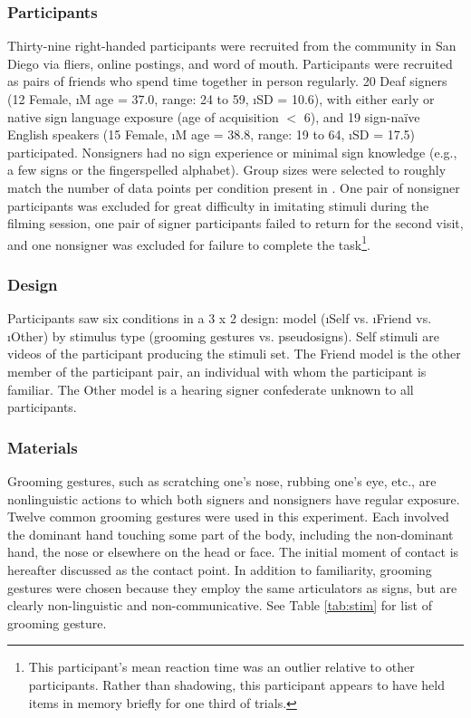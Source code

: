         \subsubsection{Participants}
            Thirty-nine right-handed participants were recruited from the community in San Diego via fliers, online postings, and word of mouth. Participants were recruited as pairs of friends who spend time together in person regularly. 20 Deaf signers (12 Female, \i{M} age = 37.0, range: 24 to 59, \i{SD} = 10.6), with either early or native sign language exposure (age of acquisition $<$ 6), and 19 sign-na\"ive English speakers (15 Female, \i{M} age = 38.8, range: 19 to 64, \i{SD} = 17.5) participated. Nonsigners had no sign experience or minimal sign knowledge (e.g., a few signs or the fingerspelled alphabet). Group sizes were selected to roughly match the number of data points per condition present in . One pair of nonsigner participants was excluded for great difficulty in imitating stimuli during the filming session, one pair of signer participants failed to return for the second visit, and one nonsigner was excluded for failure to complete the task\footnote{This participant's mean reaction time was an outlier relative to other participants. Rather than shadowing, this participant appears to have held items in memory briefly for one third of trials.}.\par
        \subsubsection{Design}
            Participants saw six conditions in a 3 x 2 design: model (\i{Self} vs. \i{Friend} vs. \i{Other}) by stimulus type (grooming gestures vs. pseudosigns). Self stimuli are videos of the participant producing the stimuli set. The Friend model is the other member of the participant pair, an individual with whom the participant is familiar. The Other model is a hearing signer confederate unknown to all participants.\par
        \subsubsection{Materials}
            Grooming gestures, such as scratching one’s nose, rubbing one’s eye, etc., are nonlinguistic actions to which both signers and nonsigners have regular exposure. Twelve common grooming gestures were used in this experiment. Each involved the dominant hand touching some part of the body, including the non-dominant hand, the nose or elsewhere on the head or face. The initial moment of contact is hereafter discussed as the contact point. In addition to familiarity, grooming gestures were chosen because they employ the same articulators as signs, but are clearly non-linguistic and non-communicative. See Table \ref{tab:stim} for list of grooming gesture.\par

